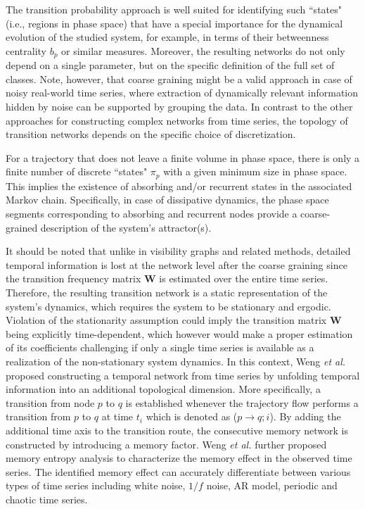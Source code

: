 	The transition probability approach is well suited for identifying such ``states" (i.e., regions in phase space) that have a special importance for the dynamical evolution of the studied system, for example, in terms of their betweenness centrality $b_p$ or similar measures. Moreover, the resulting networks do not only depend on a single parameter, but on the specific definition of the full set of classes. Note, however, that coarse graining might be a valid approach in case of noisy real-world time series, where extraction of dynamically relevant information hidden by noise can be supported by grouping the data. In contrast to the other approaches for constructing complex networks from time series, the topology of transition networks depends on the specific choice of discretization. 

	For a trajectory that does not leave a finite volume in phase space, there is only a finite number of discrete ``states" $\pi_p$ with a given minimum size in phase space. This implies the existence of absorbing and/or recurrent states in the associated Markov chain. Specifically, in case of dissipative dynamics, the phase space segments corresponding to absorbing and recurrent nodes provide a coarse-grained description of the system's attractor(s).
		
		It should be noted that unlike in visibility graphs and related methods, detailed temporal information is lost at the network level after the coarse graining since the transition frequency matrix $\mathbf{W}$ is estimated over the entire time series. Therefore, the resulting transition network is a static representation of the system's dynamics, which requires the system to be stationary and ergodic. Violation of the stationarity assumption could imply the transition matrix $\mathbf{W}$ being explicitly time-dependent, which however would make a proper estimation of its coefficients challenging if only a single time series is available as a realization of the non-stationary system dynamics. In this context, Weng {\emph {et al.}} \cite{Weng2017} proposed constructing a temporal network from time series by unfolding temporal information into an additional topological dimension. More specifically, a transition from node $p$ to $q$ is established whenever the trajectory flow performs a transition from $p$ to $q$ at time $t_i$ which is denoted as ($p \to q; i$). By adding the additional time axis to the transition route, the consecutive memory network is constructed by introducing a memory factor. Weng {\textit{et al.}} further proposed memory entropy analysis to characterize the memory effect in the observed time series. The identified memory effect can accurately differentiate between various types of time series including white noise, $1/f$ noise, AR model, periodic and chaotic time series. 

